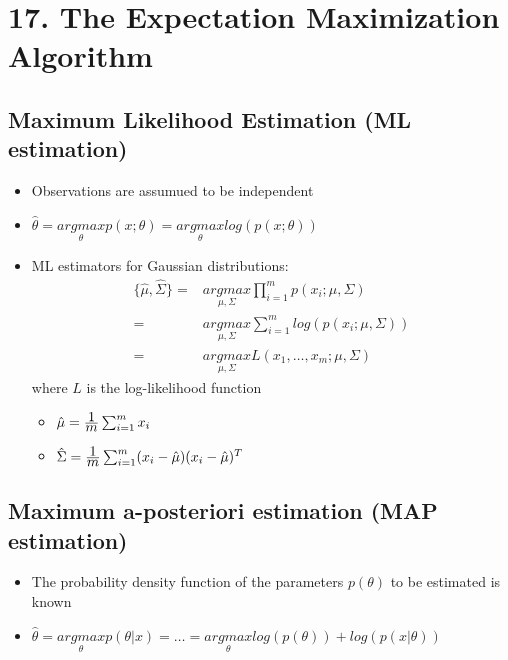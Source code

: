 \section*{17. The Expectation Maximization Algorithm}
\subsection*{Maximum Likelihood Estimation (ML estimation)}
\begin{itemize}
    \item
        Observations are assumued to be independent
    \item
        $\hat{\theta} = \underset{\theta}{argmax} p(x;\theta) = \underset{\theta}{argmax} log(p(x;\theta))$
    \item
        ML estimators for Gaussian distributions:
        \begin{align*}
            \{\hat{\mu}, \hat{\Sigma}\} = & \underset{\mu, \Sigma}{argmax} \prod_{i=1}^m p(x_i; \mu, \Sigma)\\ 
            = & \underset{\mu, \Sigma}{argmax} \sum_{i=1}^m log(p(x_i; \mu, \Sigma))\\
            = & \underset{\mu, \Sigma}{argmax} L(x_1, \dots, x_m; \mu, \Sigma)
        \end{align*}
        where $L$ is the log-likelihood function
        \begin{itemize}
            \item
                $\hat{\mu} = \frac{\displaystyle 1}{\displaystyle m} \sum_{i=1}^m x_i$
            \item
                $\hat{\Sigma} = \frac{\displaystyle 1}{\displaystyle m} \sum_{i=1}^m (x_i - \hat{\mu})(x_i - \hat{\mu})^T$
                
        \end{itemize}
\end{itemize}
\subsection*{Maximum a-posteriori estimation (MAP estimation)}
\begin{itemize}
    \item
        The probability density function of the parameters $p(\theta)$ to be estimated is known
    \item
        $\hat{\theta} = \underset{\theta}{argmax} p(\theta|x) = \dots = \underset{\theta}{argmax} log(p(\theta)) + log(p(x|\theta))$
\end{itemize}
